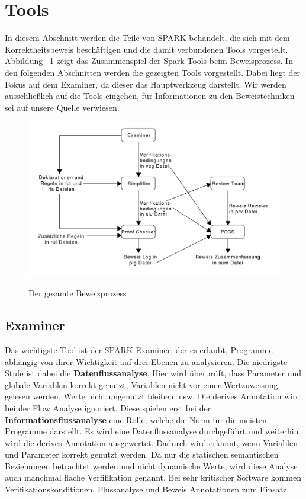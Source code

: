 
\section{Tools}
\label{sec:tools}
In diesem Abschnitt werden die Teile von SPARK behandelt, die sich mit dem Korrektheitsbeweis beschäftigen und die damit verbundenen Tools vorgestellt.
Abbildung ~\ref{fig:proofProcess} zeigt das Zusammenspiel der Spark Tools beim Beweisprozess. In den folgenden Abschnitten werden die gezeigten Tools vorgestellt. Dabei liegt der Fokus auf dem Examiner, da dieser das Hauptwerkzeug darstellt. Wir werden ausschließlich auf die Tools eingehen, für Informationen zu den Beweistechniken sei auf unsere Quelle verwiesen.

\begin{figure}[h]
\includegraphics[width=\textwidth{}]{images/ProofProcess.pdf}
\label{fig:proofProcess}
\caption{Der gesamte Beweisprozess}
\end{figure}

\subsection{Examiner}
\label{sec:examiner}
Das wichtigste Tool ist der SPARK Examiner, der es erlaubt, Programme abhängig von ihrer Wichtigkeit auf drei Ebenen zu analysieren. Die niedrigste Stufe ist dabei die \textbf{Datenflussanalyse}. Hier wird überprüft, dass Parameter und globale Variablen korrekt genutzt, Variablen nicht vor einer Wertzuweisung gelesen werden, Werte nicht ungenutzt bleiben, usw. Die derives Annotation wird bei der Flow Analyse ignoriert.
Diese spielen erst bei der \textbf{Informationsflussanalyse} eine Rolle, welche die Norm für die meisten Programme darstellt. Es wird eine Datenflussanalyse durchgeführt und weiterhin wird die derives Annotation ausgewertet. Dadurch wird erkannt, wenn Variablen und Parameter korrekt genutzt werden. Da nur die statischen semantischen Beziehungen betrachtet werden und nicht dynamische Werte, wird diese Analyse auch manchmal flache Verfifikation genannt.
Bei sehr kritischer Software kommen Verifikationskonditionen, Flussanalyse und Beweis Annotationen zum Einsatz.

